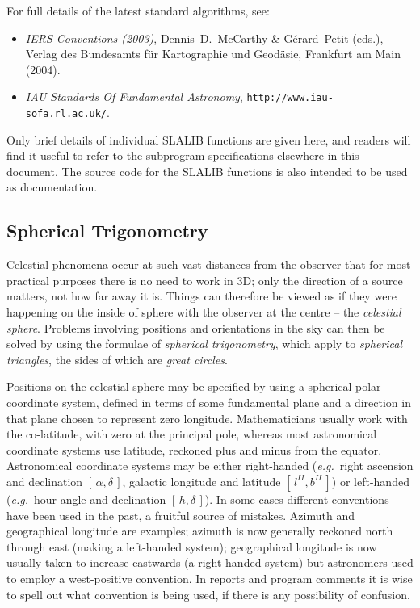\documentclass[11pt,fleqn,twoside]{article}
\renewcommand{\_}{{\tt\char'137}}     %
\newcommand{\radec}     {$[\,\alpha,\delta\,]$}
\newcommand{\hadec}     {$[\,h,\delta\,]$}
\newcommand{\gal}       {$[\,l^{I\!I},b^{I\!I}\,]$}
\begin{document}
For full details of the latest standard algorithms, see:
\begin{itemize}
\item {\it IERS Conventions (2003)}, Dennis~D.~McCarthy \&
      G\'{e}rard~Petit (eds.), Verlag des Bundesamts f\"{u}r
      Kartographie und Geod\"{a}sie, Frankfurt am Main (2004).
\item {\it IAU Standards Of Fundamental Astronomy},
      {\tt http://www.iau-sofa.rl.ac.uk/}.
\end{itemize}
Only brief details of individual SLALIB functions are given here, and
readers will find it useful to refer to the subprogram specifications
elsewhere in this document.  The source code for the SLALIB functions
is also intended to be used as documentation.
 
\subsection {Spherical Trigonometry}
Celestial phenomena occur at such vast distances from the
observer that for most practical purposes there is no need to
work in 3D;  only the direction
of a source matters, not how far away it is.  Things can
therefore be viewed as if they were happening
on the inside of sphere with the observer at the centre --
the {\it celestial sphere}.  Problems involving
positions and orientations in the sky can then be solved by
using the formulae of {\it spherical trigonometry}, which
apply to {\it spherical triangles}, the sides of which are
{\it great circles}.
 
Positions on the celestial sphere may be specified by using
a spherical polar coordinate system, defined in terms of
some fundamental plane and a direction in that plane chosen to
represent zero longitude.  Mathematicians usually work with the
co-latitude, with zero at the principal pole, whereas most
astronomical coordinate systems use latitude, reckoned plus and
minus from the equator.
Astronomical coordinate systems may be either right-handed
({\it e.g.}\ right ascension and declination \radec,
galactic longitude and latitude \gal)
or left-handed ({\it e.g.}\ hour angle and
declination \hadec).  In some cases
different conventions have been used in the past, a fruitful source of
mistakes.  Azimuth and geographical longitude are examples;  azimuth
is now generally reckoned north through east
(making a left-handed system);  geographical longitude is now usually
taken to increase eastwards (a right-handed system) but astronomers
used to employ a west-positive convention.  In reports
and program comments it is wise to spell out what convention
is being used, if there is any possibility of confusion.
 
\end{document}
